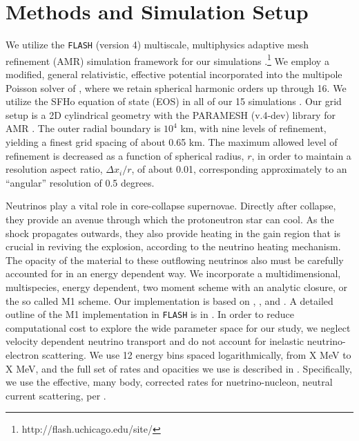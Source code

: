 \documentclass[twocolumn,times]{aastex62}  %
\begin{document}
\section{Methods and Simulation Setup}
\label{sec:method}
We utilize the \texttt{FLASH} (version 4) multiscale, multiphysics adaptive mesh refinement (AMR) simulation framework for our simulations \citep{fryxell:2000,dubey:2009}.\footnote{http://flash.uchicago.edu/site/}  We employ a modified, general relativistic, effective potential \citep{marek:2006, oconnor:2018} incorporated into the multipole Poisson solver of \citet{couch:2013a}, where we retain spherical harmonic orders up through 16.   We utilize the SFHo equation of state (EOS) in all of our 15 simulations \citep{steiner:2013}.  Our grid setup is a 2D cylindrical geometry with the PARAMESH (v.4-dev) library for AMR  \citep{macneice:2000}.  The outer radial boundary is $10^4$ km, with nine levels of refinement, yielding a finest grid spacing of about 0.65 km.
The maximum allowed level of refinement is decreased as a function of spherical radius, $r$, in order to maintain a resolution aspect ratio, $\Delta x_i / r$, of about 0.01, corresponding approximately to an ``angular'' resolution of 0.5 degrees.

Neutrinos play a vital role in core-collapse supernovae.  Directly after collapse, they provide an avenue through which the protoneutron star can cool.  As the shock propagates outwards, they also provide heating in the gain region that is crucial in reviving the explosion, according to the neutrino heating mechanism.  The opacity of the material to these outflowing neutrinos also must be carefully accounted for in an energy dependent way.  We incorporate a multidimensional, multispecies, energy dependent, two moment scheme with an analytic closure, or the so called M1 scheme.  Our implementation is based on \citet{oconnor:2015}, \citet{shibata:2011}, and \citet{cardall:2013}.  A detailed outline of the M1 implementation in \texttt{FLASH} is in \citet{oconnor:2018}.  In order to reduce computational cost to explore the wide parameter space for our study, we neglect velocity dependent neutrino transport and do not account for inelastic neutrino-electron scattering.
We use 12 energy bins spaced logarithmically, from X MeV to X MeV, and the full set of rates and opacities we use is described in \citet{oconnor:2017a}. 
Specifically, we use the effective, many body, corrected rates
for nuetrino-nucleon, neutral current scattering, per \citet{horowitz:2017}.  
\end{document}
